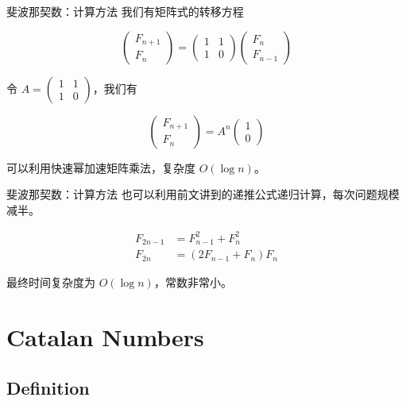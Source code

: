 \documentclass[12pt,aspectratio=169]{beamer}
\begin{document}
\begin{frame}[fragile]{斐波那契数：计算方法}
我们有矩阵式的转移方程

$$
\begin{pmatrix}
  F_{n+1} \\
  F_{n}
\end{pmatrix}
=
\begin{pmatrix}
  1 & 1 \\
  1 & 0
\end{pmatrix}
\begin{pmatrix}
  F_{n} \\
  F_{n-1}
\end{pmatrix}
$$

令 $A = \begin{pmatrix}1 & 1 \\ 1 & 0\end{pmatrix}$，我们有

$$
\begin{pmatrix}
  F_{n+1} \\
  F_{n}
\end{pmatrix}
= A^n
\begin{pmatrix}
  1 \\
  0
\end{pmatrix}
$$

可以利用快速幂加速矩阵乘法，复杂度 $O(\log n)$。
\end{frame}

\begin{frame}[fragile]{斐波那契数：计算方法}
  也可以利用前文讲到的递推公式递归计算，每次问题规模减半。
  
  $$
  \begin{aligned}
    F_{2n-1} &= F_{n-1}^2 + F_{n}^2 \\
    F_{2n} &= (2 F_{n-1}+  F_{n}) F_{n}
  \end{aligned}
  $$

  最终时间复杂度为 $O(\log n)$，常数非常小。
\end{frame}

\section[卡特兰数]{Catalan Numbers}

\subsection[卡特兰数]{Definition}
\end{document}
